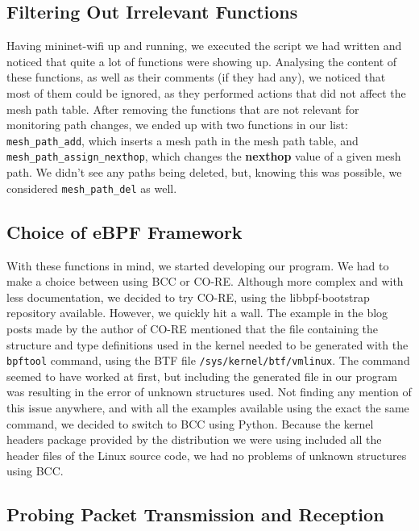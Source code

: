 \subsection{Filtering Out Irrelevant Functions}

Having mininet-wifi up and running, we executed the script we had written and
noticed that quite a lot of functions were showing up. Analysing the content of
these functions, as well as their comments (if they had any), we noticed that
most of them could be ignored, as they performed actions that did not affect the
mesh path table. After removing the functions that are not relevant for
monitoring path changes, we ended up with two functions in our list:
\texttt{mesh\_path\_add}, which inserts a mesh path in the mesh path table, and
\texttt{mesh\_path\_assign\_nexthop}, which changes the \textbf{nexthop} value
of a given mesh path. We didn't see any paths being deleted, but, knowing this
was possible, we considered \texttt{mesh\_path\_del} as well.


\subsection{Choice of eBPF Framework}

With these functions in mind, we started developing our program. We had to make
a choice between using \ac{BCC} or \ac{CO-RE}. Although more complex and with
less documentation, we decided to try \ac{CO-RE}, using the libbpf-bootstrap
repository available. However, we quickly hit a wall. The example in the blog
posts made by the author of \ac{CO-RE} mentioned that the file containing the
structure and type definitions used in the kernel needed to be generated with
the \texttt{bpftool} command, using the \ac{BTF} file
\texttt{/sys/kernel/btf/vmlinux}. The command seemed to have worked at first,
but including the generated file in our program was resulting in the error of
unknown structures used. Not finding any mention of this issue anywhere, and
with all the examples available using the exact the same command, we decided to
switch to \ac{BCC} using Python. Because the kernel headers package provided by
the distribution we were using included all the header files of the Linux source
code, we had no problems of unknown structures using \ac{BCC}.


\subsection{Probing Packet Transmission and Reception}\label{subs:pkt}

